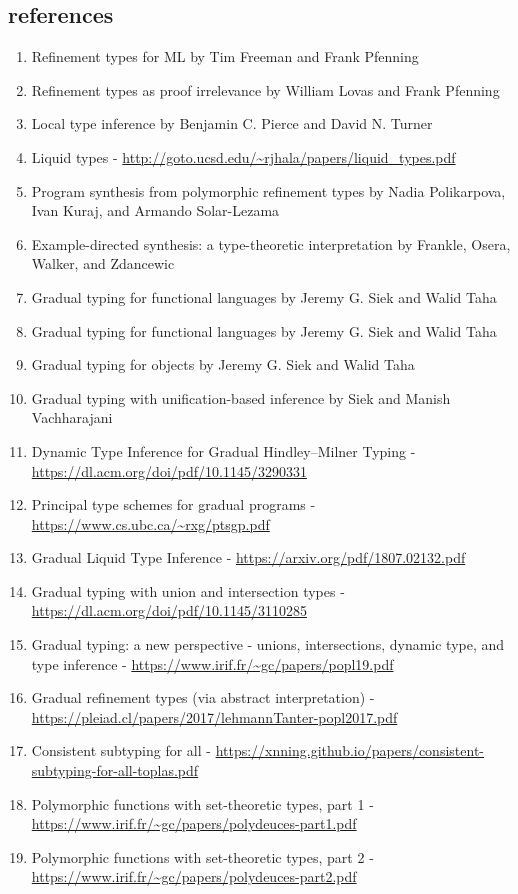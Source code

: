 \documentclass[sigplan,screen]{acmart}
\begin{document}
\subsection*{references}
\begin{enumerate}
\item Refinement types for ML by Tim Freeman and Frank Pfenning 
\item Refinement types as proof irrelevance by William Lovas and Frank Pfenning 
\item Local type inference by Benjamin C. Pierce and David N. Turner
\item Liquid types - \url{http://goto.ucsd.edu/~rjhala/papers/liquid_types.pdf}
\item Program synthesis from polymorphic refinement types by Nadia Polikarpova, Ivan Kuraj, and Armando Solar-Lezama
\item Example-directed synthesis: a type-theoretic interpretation by Frankle, Osera, Walker, and Zdancewic
\item Gradual typing for functional languages by Jeremy G. Siek and Walid Taha 
\item Gradual typing for functional languages by Jeremy G. Siek and Walid Taha 
\item Gradual typing for objects by Jeremy G. Siek and Walid Taha 
\item Gradual typing with unification-based inference by Siek and Manish Vachharajani 
\item Dynamic Type Inference for Gradual Hindley–Milner Typing - \url{https://dl.acm.org/doi/pdf/10.1145/3290331}
\item Principal type schemes for gradual programs - \url{https://www.cs.ubc.ca/~rxg/ptsgp.pdf}
\item Gradual Liquid Type Inference - \url{https://arxiv.org/pdf/1807.02132.pdf}
\item Gradual typing with union and intersection types - \url{https://dl.acm.org/doi/pdf/10.1145/3110285}
\item Gradual typing: a new perspective - unions, intersections, dynamic type, and type inference - \url{https://www.irif.fr/~gc/papers/popl19.pdf}
\item Gradual refinement types (via abstract interpretation) - \url{https://pleiad.cl/papers/2017/lehmannTanter-popl2017.pdf}
\item Consistent subtyping for all - \url{https://xnning.github.io/papers/consistent-subtyping-for-all-toplas.pdf}
\item Polymorphic functions with set-theoretic types, part 1 - \url{https://www.irif.fr/~gc/papers/polydeuces-part1.pdf}
\item Polymorphic functions with set-theoretic types, part 2 - \url{https://www.irif.fr/~gc/papers/polydeuces-part2.pdf}


\end{enumerate}
\end{document}
